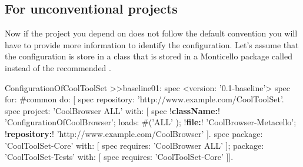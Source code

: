 \documentclass[a4paper,10pt,twoside]{book}
\begin{document}
\subsection{For unconventional projects}

Now if the project you depend on does not follow the default convention you will have to provide more information to identify
the configuration. Let's assume that the configuration is store in a class  that is stored in a Monticello package called  instead of the recommended .


\begin{code}{}
ConfigurationOfCoolToolSet >>baseline01: spec 
       <version: '0.1-baseline'>
       spec for: #common do: [
              spec repository: 'http://www.example.com/CoolToolSet'.
              spec project: 'CoolBrowser ALL' with: [
                            spec 
                                   !\textbf{className:}! 'ConfigurationOfCoolBrowser';
                                   loads: #('ALL' );
                                   !\textbf{file:}! 'CoolBrowser-Metacello';
                                   !\textbf{repository:}! 'http://www.example.com/CoolBrowser' ].
              spec 
                     package: 'CoolToolSet-Core' with: [ spec requires: 'CoolBrowser ALL' ];
                     package: 'CoolToolSet-Tests' with: [ spec requires: 'CoolToolSet-Core' ]].
\end{code}       
\end{document}
